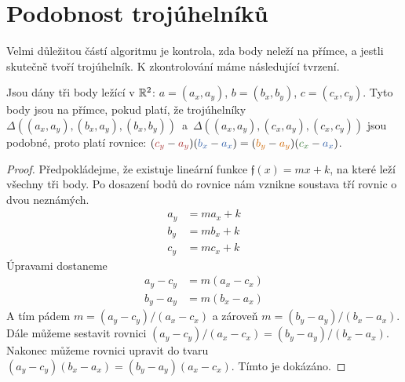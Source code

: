 \section{Podobnost trojúhelníků}
\label{sec:podobnost}
Velmi důležitou částí algoritmu je kontrola, zda body neleží na přímce, a jestli skutečně tvoří trojúhelník. K zkontrolování máme následující tvrzení.

\begin{tvrzeni}
  \label{tvrzeni:podobnost_trojuhelniku}
  Jsou dány tři body ležící v $\mathbb{R}^2$: $a = (a_x, a_y)$, $b = (b_x, b_y)$, $c = (c_x, c_y)$. Tyto body jsou na přímce, pokud platí, že trojúhelníky $\Delta((a_x, a_y), (b_x, a_y), (b_x, b_y))$~a~$\Delta((a_x, a_y), (c_x, a_y), (c_x, c_y))$ jsou podobné, proto platí rovnice: $(\textcolor{myred}{c_y}-\textcolor{myred}{a_y})(\textcolor{myblue}{b_x}-\textcolor{myblue}{a_x}) = (\textcolor{myorange}{b_y}-\textcolor{myorange}{a_y})(\textcolor{mygreen}{c_x}-\textcolor{myblue}{a_x})$.
\end{tvrzeni}

\begin{proof}
  Předpokládejme, že existuje lineární funkce $\mathfrak{f}(x) = mx+k$, na které leží všechny tři body. Po dosazení bodů do rovnice nám vznikne soustava tří rovnic o dvou neznámých.
  \begin{align*}
    a_y & = ma_x+k \\
    b_y & = mb_x+k \\
    c_y & = mc_x+k
  \end{align*}
  Úpravami dostaneme
  \begin{align*}
    a_y-c_y & = m(a_x-c_x) \\
    b_y-a_y & = m(b_x-a_x)
  \end{align*}
  A tím pádem $m = (a_y-c_y)/(a_x-c_x)$ a zároveň $ m=(b_y-a_y)/(b_x-a_x)$. Dále můžeme sestavit rovnici $(a_y-c_y)/(a_x-c_x) = (b_y-a_y)/(b_x-a_x)$. Nakonec můžeme rovnici upravit do tvaru $(a_y-c_y)(b_x-a_x) = (b_y-a_y)(a_x-c_x)$. Tímto je  dokázáno.
\end{proof}

